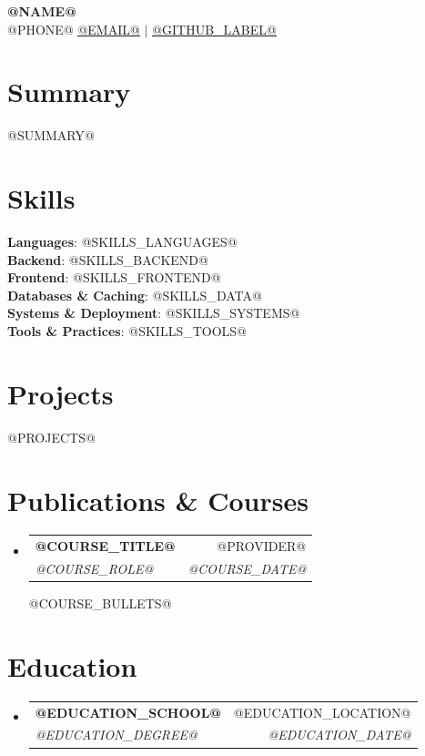 \documentclass[letterpaper,10pt]{article}
\makeatletter
\newcommand{\resumeSubheading}[4]{
  \vspace{-2pt}\item
    \begin{tabular*}{0.97\textwidth}[t]{l@{\extracolsep{\fill}}r}
      \textbf{#1} & #2 \\
      \textit{\small#3} & \textit{\small #4} \\
    \end{tabular*}\vspace{-6pt}
}
\newcommand{\resumeSubHeadingListStart}{\begin{itemize}[leftmargin=0.15in, label={}]}
\newcommand{\resumeSubHeadingListEnd}{\end{itemize}}
\newcommand{\resumeItemListStart}{\begin{itemize}[leftmargin=0.2in]}
\newcommand{\resumeItemListEnd}{\end{itemize}\vspace{-4pt}}
\makeatother
\begin{document}
\begin{center}
    \textbf{\Huge \scshape @NAME@} \\ \vspace{2pt}
    \small @PHONE@
    \href{mailto:@EMAIL_URL@}{\underline{@EMAIL@}} $|$
    \href{@GITHUB_URL@}{\underline{@GITHUB_LABEL@}}
\end{center}

\section{Summary}
\small{
@SUMMARY@
}

\section{Skills}
 \begin{itemize}[leftmargin=0.15in, label={}]
    \small{\item{
     \textbf{Languages}{: @SKILLS_LANGUAGES@} \\
     \textbf{Backend}{: @SKILLS_BACKEND@} \\
     \textbf{Frontend}{: @SKILLS_FRONTEND@} \\
     \textbf{Databases \& Caching}{: @SKILLS_DATA@} \\
     \textbf{Systems \& Deployment}{: @SKILLS_SYSTEMS@} \\
     \textbf{Tools \& Practices}{: @SKILLS_TOOLS@}
    }}
 \end{itemize}

\section{Projects}
    \resumeSubHeadingListStart
@PROJECTS@
    \resumeSubHeadingListEnd

\section{Publications \& Courses}
  \resumeSubHeadingListStart
    \resumeSubheading
      {@COURSE_TITLE@}{@PROVIDER@}
      {@COURSE_ROLE@}{@COURSE_DATE@}
      \resumeItemListStart
@COURSE_BULLETS@
      \resumeItemListEnd

  \resumeSubHeadingListEnd

\section{Education}
  \resumeSubHeadingListStart
    \resumeSubheading
      {@EDUCATION_SCHOOL@}{@EDUCATION_LOCATION@}
      {@EDUCATION_DEGREE@}{@EDUCATION_DATE@}
  \resumeSubHeadingListEnd

\end{document}
